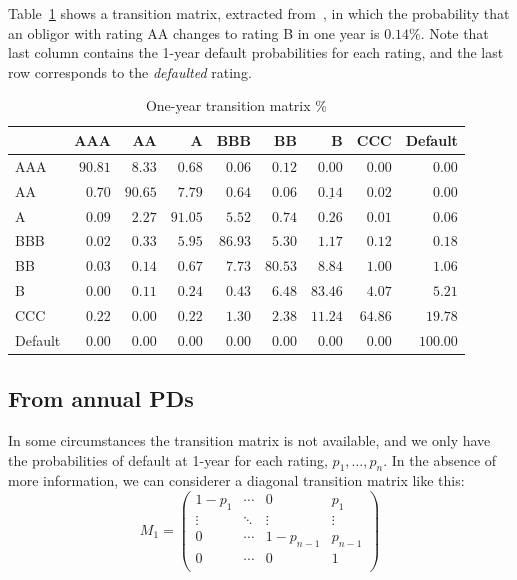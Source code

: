 \documentclass[11pt,fleqn]{book} %
\begin{document}
\begin{example}
	\label{ex:1ytm}
	Table~\ref{tmatrix1} shows a transition matrix, extracted 
	from~\cite[p. 20]{cmetrics:1997}, in which the probability that an obligor 
	with rating AA changes to rating B in one year is $0.14\%$. Note that 
	last column contains the 1-year default probabilities for each rating, and 
	the last row corresponds to the \emph{defaulted} rating.
	\begin{table}[!ht]
		\begin{center}
			\begin{tabular}[]{l|rrrrrrrr}
				        & AAA     & AA      & A       & BBB     & BB      & B                  & CCC     & Default  \\
				\hline
				AAA     & $90.81$ & $8.33$  & $0.68$  & $0.06$  & $0.12$  & $0.00$             & $0.00$  & $0.00$   \\
				AA      & $0.70$  & $90.65$ & $7.79$  & $0.64$  & $0.06$  & $\underline{0.14}$ & $0.02$  & $0.00$   \\
				A       & $0.09$  & $2.27$  & $91.05$ & $5.52$  & $0.74$  & $0.26$             & $0.01$  & $0.06$   \\
				BBB     & $0.02$  & $0.33$  & $5.95$  & $86.93$ & $5.30$  & $1.17$             & $0.12$  & $0.18$   \\
				BB      & $0.03$  & $0.14$  & $0.67$  & $7.73$  & $80.53$ & $8.84$             & $1.00$  & $1.06$   \\
				B       & $0.00$  & $0.11$  & $0.24$  & $0.43$  & $6.48$  & $83.46$            & $4.07$  & $5.21$   \\
				CCC     & $0.22$  & $0.00$  & $0.22$  & $1.30$  & $2.38$  & $11.24$            & $64.86$ & $19.78$  \\
				Default & $0.00$  & $0.00$  & $0.00$  & $0.00$  & $0.00$  & $0.00$             & $0.00$  & $100.00$ \\
			\end{tabular}
			\caption{One-year transition matrix \%}
			\label{tmatrix1}
		\end{center}
	\end{table}
\end{example}

\subsection{From annual PDs}
\label{pdfsv}

In some circumstances the transition matrix is not available, and we only 
have the probabilities of default at 1-year for each rating, 
$p_1,\dots,p_n$. In the absence of more information, we can considerer 
a diagonal transition matrix like this:
\begin{displaymath}
	M_1 = \left(
	\begin{array}{cccc}
		1-p_1  & \cdots & 0         & p_1     \\
		\vdots & \ddots & \vdots    & \vdots  \\
		0      & \cdots & 1-p_{n-1} & p_{n-1} \\
		0      & \cdots & 0         & 1       \\
	\end{array}
	\right)
\end{displaymath}
\end{document}
